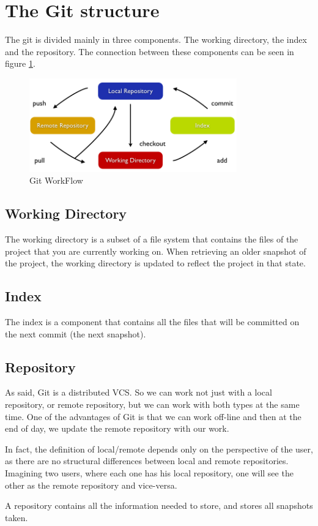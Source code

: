 \section{The Git structure}
The git is divided mainly in three components. The working directory,
the index and the repository. The connection between these components
can be seen in figure \ref{fig:git_structure}. 

\begin{figure}[h!]
   \centering
   \includegraphics[width=0.8\textwidth]{images/data_flow_simplified.png}
   \caption{Git WorkFlow}\label{fig:git_structure}
\end{figure}

\subsection{Working Directory}

The working directory is a subset of
a file system that contains the files of the project that you are
currently working on. When retrieving an older snapshot of the project, the
working directory is updated to reflect the project in that state.

\subsection{Index}
The index is a component that contains all the files that will be committed
on the next commit (the next snapshot).

\subsection{Repository}
As said, Git is a distributed VCS. So we can work not just with a local repository,
or remote repository, but we can work with both types at the same time. One of 
the advantages of Git is that we can work off-line and then at the end of day,
we update the remote repository with our work. \par
In fact, the definition of local/remote depends only on the perspective of the user,
as there are no structural differences between local and remote repositories. 
Imagining two users, where each one has his local repository, 
one will see the other as the remote repository and vice-versa. \par
A repository contains all the information needed to store, and stores all snapshots taken.
%
